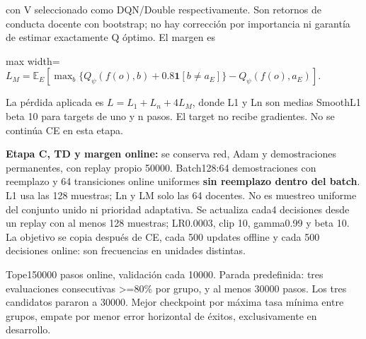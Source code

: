 \documentclass[12pt,a4paper]{article}
\begin{document}
con V seleccionado como DQN/\allowbreak{}Double respectivamente. Son retornos de conducta docente con bootstrap; no hay corrección por importancia ni garantía de estimar exactamente Q óptimo. El margen es



\begin{center}\begin{adjustbox}{max width=\linewidth}$\displaystyle L_M=\mathbb E_E\left[\max_b\{Q_\psi(f(o),b)+0.8\mathbf1[b\ne a_E]\}
-Q_\psi(f(o),a_E)\right].$\end{adjustbox}\end{center}



La pérdida aplicada es $L=L_1+L_n+4L_M$,\allowbreak{} donde L1 y Ln son medias SmoothL1 beta 10 para targets de uno y n pasos. El target no recibe gradientes. No se continúa CE en esta etapa.


\textbf{Etapa C,\allowbreak{} TD y margen online:} se conserva red,\allowbreak{} Adam y demostraciones permanentes,\allowbreak{} con replay propio 50000. Batch128:64 demostraciones con reemplazo y 64 transiciones online uniformes \textbf{sin reemplazo dentro del batch}. L1 usa las 128 muestras; Ln y LM solo las 64 docentes. No es muestreo uniforme del conjunto unido ni prioridad adaptativa. Se actualiza cada4 decisiones desde un replay con al menos 128 muestras; LR0.0003,\allowbreak{} clip 10,\allowbreak{} gamma0.99 y beta 10. La objetivo se copia después de CE,\allowbreak{} cada 500 updates offline y cada 500 decisiones online: son frecuencias en unidades distintas.


Tope150000 pasos online,\allowbreak{} validación cada 10000. Parada predefinida: tres evaluaciones consecutivas >=80\% por grupo,\allowbreak{} y al menos 30000 pasos. Los tres candidatos pararon a 30000. Mejor checkpoint por máxima tasa mínima entre grupos,\allowbreak{} empate por menor error horizontal de éxitos,\allowbreak{} exclusivamente en desarrollo.
\end{document}

